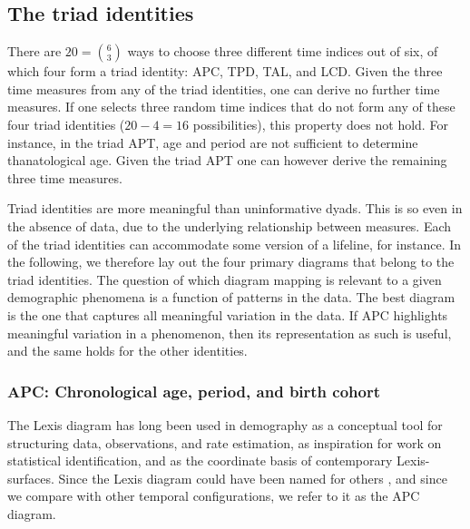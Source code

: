 \documentclass[12pt,oneside,a4paper,doublespacing]{article} %
\theoremstyle{definition}
\begin{document}
\subsection{The triad identities}
\label{sec:triads}
There are $20=\binom{6}{3}$ ways to choose three different time indices out of
six, of which four form a triad identity: APC, TPD, TAL, and LCD.
Given the three time measures from any of the
triad identities, one can derive no further time measures. If one selects three
random time indices that do not form any of these four triad identities
($20-4=16$ possibilities), this property does not hold. For instance, in the
triad APT, age and period are not sufficient to determine thanatological age.
Given the triad APT one can however derive the remaining three time
measures.

Triad identities are more meaningful than uninformative dyads. This
is so even in the absence of data, due to the underlying relationship between
measures. Each of the triad identities can accommodate some version of a
lifeline, for instance. In the following, we therefore lay out the four primary
diagrams that belong to the triad identities. The question of which diagram
mapping is relevant to a given demographic phenomena is a function of
patterns in the data. The best diagram is the one that captures all meaningful
variation in the data. If APC highlights meaningful variation in a phenomenon,
then its representation as such is useful, and the same holds for the other
identities.

\subsubsection{APC: Chronological age, period, and birth cohort}
\label{sec:apc}
\FloatBarrier
The Lexis diagram has long been used in demography as a conceptual
tool for structuring data, observations, and rate estimation, as inspiration for work
on statistical identification, and as the coordinate basis of contemporary
Lexis-surfaces. Since the Lexis diagram could have been named for others
\citep{keiding2011age, vandeschrick2001lexis}, and since we compare with other
temporal configurations, we refer to it as the APC diagram. 
\end{document}
